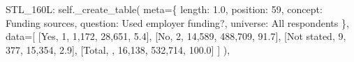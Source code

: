 \documentclass[
  11pt,
  a4paper,
]{article}
\newenvironment{Shaded}{\begin{snugshade}}{\end{snugshade}}
\newcommand{\NormalTok}[1]{\textcolor[rgb]{0.00,0.23,0.31}{#1}}
\newcommand{\OperatorTok}[1]{\textcolor[rgb]{0.37,0.37,0.37}{#1}}
\newcommand{\StringTok}[1]{\textcolor[rgb]{0.13,0.47,0.30}{#1}}
\newcommand{\VariableTok}[1]{\textcolor[rgb]{0.07,0.07,0.07}{#1}}
\begin{document}
\begin{Shaded}
\begin{Highlighting}[]
            \StringTok{\textquotesingle{}STL\_160L\textquotesingle{}}\NormalTok{: }\VariableTok{self}\NormalTok{.\_create\_table(}
\NormalTok{                meta}\OperatorTok{=}\NormalTok{\{}
                    \StringTok{\textquotesingle{}length\textquotesingle{}}\NormalTok{: }\StringTok{\textquotesingle{}1.0\textquotesingle{}}\NormalTok{, }\StringTok{\textquotesingle{}position\textquotesingle{}}\NormalTok{: }\StringTok{\textquotesingle{}59\textquotesingle{}}\NormalTok{,}
                    \StringTok{\textquotesingle{}concept\textquotesingle{}}\NormalTok{: }\StringTok{\textquotesingle{}Funding sources\textquotesingle{}}\NormalTok{,}
                    \StringTok{\textquotesingle{}question\textquotesingle{}}\NormalTok{: }\StringTok{\textquotesingle{}Used employer funding?\textquotesingle{}}\NormalTok{,}
                    \StringTok{\textquotesingle{}universe\textquotesingle{}}\NormalTok{: }\StringTok{\textquotesingle{}All respondents\textquotesingle{}}
\NormalTok{                \},}
\NormalTok{                data}\OperatorTok{=}\NormalTok{[}
\NormalTok{                    [}\StringTok{\textquotesingle{}Yes\textquotesingle{}}\NormalTok{, }\StringTok{\textquotesingle{}1\textquotesingle{}}\NormalTok{, }\StringTok{\textquotesingle{}1,172\textquotesingle{}}\NormalTok{, }\StringTok{\textquotesingle{}28,651\textquotesingle{}}\NormalTok{, }\StringTok{\textquotesingle{}5.4\textquotesingle{}}\NormalTok{],}
\NormalTok{                    [}\StringTok{\textquotesingle{}No\textquotesingle{}}\NormalTok{, }\StringTok{\textquotesingle{}2\textquotesingle{}}\NormalTok{, }\StringTok{\textquotesingle{}14,589\textquotesingle{}}\NormalTok{, }\StringTok{\textquotesingle{}488,709\textquotesingle{}}\NormalTok{, }\StringTok{\textquotesingle{}91.7\textquotesingle{}}\NormalTok{],}
\NormalTok{                    [}\StringTok{\textquotesingle{}Not stated\textquotesingle{}}\NormalTok{, }\StringTok{\textquotesingle{}9\textquotesingle{}}\NormalTok{, }\StringTok{\textquotesingle{}377\textquotesingle{}}\NormalTok{, }\StringTok{\textquotesingle{}15,354\textquotesingle{}}\NormalTok{, }\StringTok{\textquotesingle{}2.9\textquotesingle{}}\NormalTok{],}
\NormalTok{                    [}\StringTok{\textquotesingle{}Total\textquotesingle{}}\NormalTok{, }\StringTok{\textquotesingle{}\textquotesingle{}}\NormalTok{, }\StringTok{\textquotesingle{}16,138\textquotesingle{}}\NormalTok{, }\StringTok{\textquotesingle{}532,714\textquotesingle{}}\NormalTok{, }\StringTok{\textquotesingle{}100.0\textquotesingle{}}\NormalTok{]}
\NormalTok{                ]}
\NormalTok{            ),}
            

\end{Highlighting}
\end{Shaded}
\end{document}
